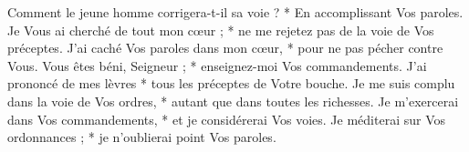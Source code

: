 Comment le jeune homme corrigera-t-il sa voie ? * En accomplissant Vos paroles.
\versseparator
Je Vous ai cherché de tout mon cœur ; * ne me rejetez pas de la voie de Vos préceptes.
\versseparator
J'ai caché Vos paroles dans mon cœur, * pour ne pas pécher contre Vous.
\versseparator
Vous êtes béni, Seigneur ; * enseignez-moi Vos commandements.
\versseparator
J'ai prononcé de mes lèvres * tous les préceptes de Votre bouche.
\versseparator
Je me suis complu dans la voie de Vos ordres, * autant que dans toutes les richesses.
\versseparator
Je m'exercerai dans Vos commandements, * et je considérerai Vos voies.
\versseparator
Je méditerai sur Vos ordonnances ; * je n'oublierai point Vos paroles.